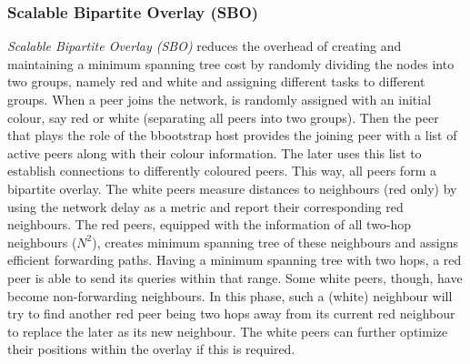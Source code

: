 %
%
%

\subsubsection{Scalable Bipartite Overlay (SBO)}
\emph{Scalable Bipartite Overlay (SBO)}
\cite{liu_bipartite_IPDPS,liu_bipartite_2007} reduces the overhead of creating
and maintaining a minimum spanning tree cost by randomly dividing the nodes into
two groups, namely red and white and assigning different tasks to different
groups. When a peer joins the network, is randomly assigned with an initial
colour, say red or white (separating all peers into two groups). Then the peer
that plays the role of the bbootstrap host provides the joining peer with a list
of active peers along with their colour information. The later uses this list to
establish connections to differently coloured peers. This way, all peers form a
bipartite overlay. The white peers measure distances to neighbours (red only) by
using the network delay as a metric and report their corresponding red
neighbours. The red peers, equipped with the information of all two-hop
neighbours ($N^2$), creates minimum spanning tree of these neighbours and
assigns efficient forwarding paths. Having a minimum spanning tree with two
hops, a red peer is able to send its queries within that range. Some white
peers, though, have become non-forwarding neighbours. In this phase, such a
(white) neighbour will try to find another red peer being two hops away from its
current red neighbour to replace the later as its new neighbour. The white peers
can further optimize their positions within the overlay if this is required.

